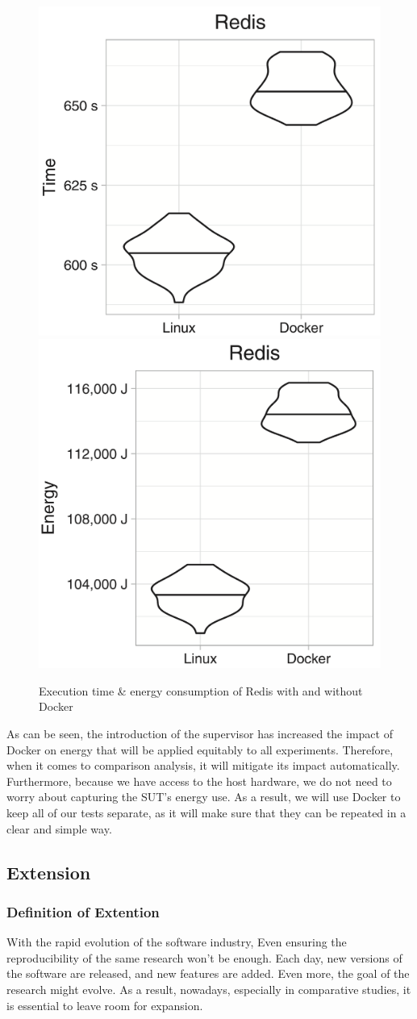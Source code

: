 \begin{figure}[!bht]
    \includegraphics[width=.5\linewidth]{imgs/docker_vs_vm_energy_paper/reddis_time}
    \includegraphics[width=.5\linewidth]{imgs/docker_vs_vm_energy_paper/reddis_energy}
    \caption{Execution time \& energy consumption of Redis with and without Docker~\cite{eddie_antonio_santos_how}}\label{fig:docker_reddis}
\end{figure}

As can be seen, the introduction of the supervisor has increased the impact of Docker on energy that will be applied equitably to all experiments.
Therefore, when it comes to comparison analysis, it will mitigate its impact automatically.
Furthermore, because we have access to the host hardware, we do not need to worry about capturing the SUT's energy use.
As a result, we will use Docker to keep all of our tests separate, as it will make sure that they can be repeated in a clear and simple way.

\subsection{Extension}
\subsubsection{Definition of Extention}
With the rapid evolution of the software industry, Even ensuring the reproducibility of the same research won't be enough.
Each day, new versions of the software are released, and new features are added. Even more, the goal of the research might evolve. As a result, nowadays, especially in comparative studies, it is essential to leave room for expansion.

